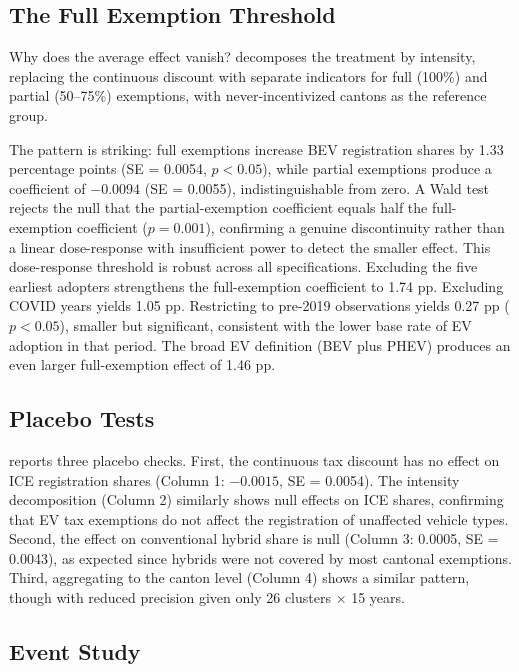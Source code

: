 \documentclass[12pt]{article}
\begin{document}
\subsection{The Full Exemption Threshold}

Why does the average effect vanish?  decomposes the treatment by intensity, replacing the continuous discount with separate indicators for full (100\%) and partial (50--75\%) exemptions, with never-incentivized cantons as the reference group.

The pattern is striking: full exemptions increase BEV registration shares by 1.33 percentage points (SE = 0.0054, $p < 0.05$), while partial exemptions produce a coefficient of $-0.0094$ (SE = 0.0055), indistinguishable from zero. A Wald test rejects the null that the partial-exemption coefficient equals half the full-exemption coefficient ($p = 0.001$), confirming a genuine discontinuity rather than a linear dose-response with insufficient power to detect the smaller effect. This dose-response threshold is robust across all specifications. Excluding the five earliest adopters strengthens the full-exemption coefficient to 1.74 pp. Excluding COVID years yields 1.05 pp. Restricting to pre-2019 observations yields 0.27 pp ($p < 0.05$), smaller but significant, consistent with the lower base rate of EV adoption in that period. The broad EV definition (BEV plus PHEV) produces an even larger full-exemption effect of 1.46 pp.



\subsection{Placebo Tests}

 reports three placebo checks. First, the continuous tax discount has no effect on ICE registration shares (Column 1: $-0.0015$, SE = 0.0054). The intensity decomposition (Column 2) similarly shows null effects on ICE shares, confirming that EV tax exemptions do not affect the registration of unaffected vehicle types. Second, the effect on conventional hybrid share is null (Column 3: 0.0005, SE = 0.0043), as expected since hybrids were not covered by most cantonal exemptions. Third, aggregating to the canton level (Column 4) shows a similar pattern, though with reduced precision given only 26 clusters $\times$ 15 years.



\subsection{Event Study}
\end{document}
